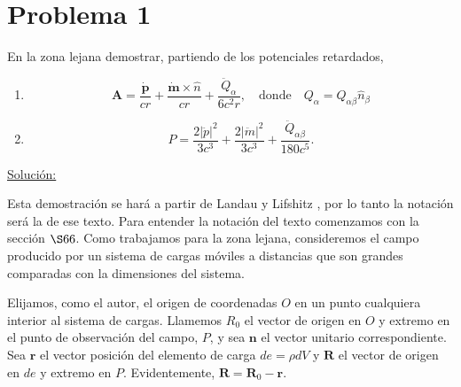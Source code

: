 \documentclass[a4paper,11pt]{article}
\numberwithin{equation}{section}
\renewcommand{\thefootnote}{\fnsymbol{footnote}}
\begin{document}

\fancyhead[R]{\thepage}

\setcounter{footnote}{0}
\renewcommand*{\thefootnote}{\arabic{footnote}}


\section{Problema 1}

En la zona lejana demostrar, partiendo de los potenciales retardados, 

\begin{enumerate}[label=\textbf{(\alph*)}]
 \item 
 
 $$
 \mathbf{A} = \frac{\dot{\mathbf{p}}}{cr} + \frac{\dot{\mathbf{m}} \times 
 \hat{n}}{cr} + \frac{\ddot{Q}_{\alpha}}{6c^2r}, \quad \text{donde} \quad
 Q_\alpha = Q_{\alpha\beta} \hat{n}_\beta
 $$
 
 \item 
 
 $$
 P = \frac{2|\ddot{p}|^2}{3c^3} + \frac{2|\ddot{m}|^2}{3c^3} +
 \frac{\ddot{Q}_{\alpha\beta}}{180c^5}.
 $$
\end{enumerate}

\underline{Solución:} \vspace{.3cm}

Esta demostración se hará a partir de Landau y Lifshitz \cite{landau}, por lo 
tanto la notación será la de ese texto. Para entender la notación del texto 
comenzamos con la sección $\S 66$. Como trabajamos para la zona lejana, consideremos 
el campo producido por un sistema de cargas móviles a distancias que son grandes 
comparadas con la dimensiones del sistema. 

\vspace{.3cm}

Elijamos, como el autor, el origen de coordenadas $O$ en un punto cualquiera interior 
al sistema de cargas. Llamemos $R_0$ el vector de origen en $O$ y extremo en el 
punto de observación del campo, $P$, y sea $\mathbf{n}$ el vector unitario 
correspondiente. Sea $\mathbf{r}$ el vector posición del elemento de carga 
$de = \rho dV$ y $\mathbf{R}$ el vector de origen en $de$ y extremo en $P$. 
Evidentemente, $\mathbf{R} = \mathbf{R}_0 - \mathbf{r}$. 
\end{document}
